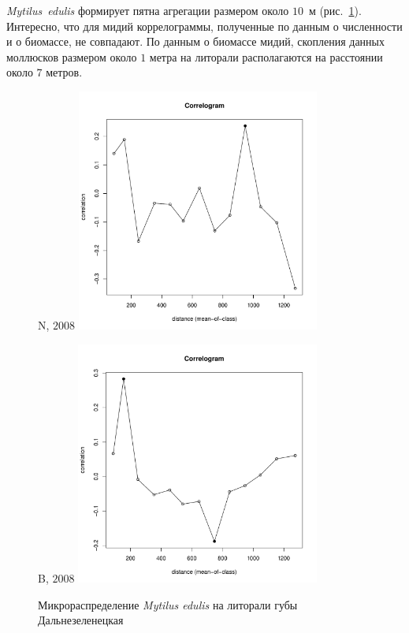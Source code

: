 \documentclass[12pt, a4paper]{disser}
\begin{document}
{\it Mytilus~edulis} формирует пятна агрегации размером около $10$~м (рис.~\ref{ris:moransI_Plyazh_Mytilus}). 
Интересно, что для мидий коррелограммы, полученные по данным о численности и о биомассе, не совпадают. 
По данным о биомассе мидий, скопления данных моллюсков размером около $1$ метра на литорали располагаются на расстоянии около $7$ метров.

	\begin{figure}[h]
	\begin{minipage}[b]{.5\linewidth}
	\begin{center}
	{\small N, $2008$}
		\includegraphics[width=80mm]{../Barenc_Sea/distribution_Moran/Plyazh082_moran_N_Mytilus_edulis_.pdf}
	\end{center}
	\end{minipage}
	\hfil %
	\begin{minipage}[b]{.5\linewidth}
	\begin{center}
	{\small B, $2008$}
		\includegraphics[width=80mm]{../Barenc_Sea/distribution_Moran/Plyazh082_moran_B_Mytilus_edulis_.pdf}
	\end{center}
	\end{minipage}


	\caption{Микрораспределение {\it Mytilus edulis} на литорали губы Дальнезеленецкая}
	\label{ris:moransI_Plyazh_Mytilus}
	\end{figure}
\end{document}
